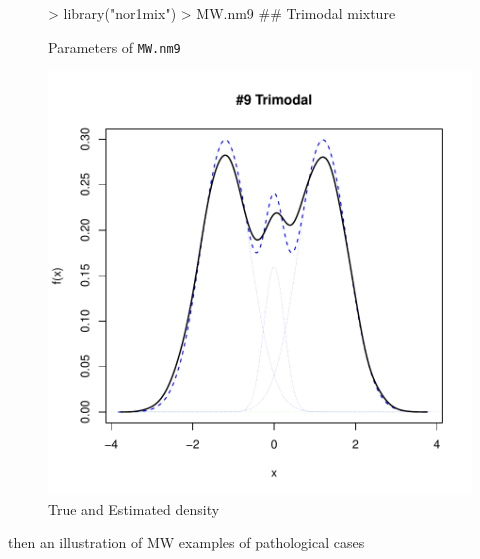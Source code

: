 \begin{figure}[h]
    \centering
    \begin{minipage}{0.45\textwidth}
\begin{Schunk}
\begin{Sinput}
>     library("nor1mix")
>     MW.nm9 ## Trimodal mixture
\end{Sinput}
\end{Schunk}
        \caption{Parameters of {\tt MW.nm9}}
        \label{tab:MW.nm9}
    \end{minipage}
    \begin{minipage}{0.45\textwidth}
\includegraphics{chapter1-figTrimodal}
        \caption{True and Estimated density}
        \label{fig:MW.nm9}
    \end{minipage}
\end{figure}

then an illustration of MW examples of pathological cases




